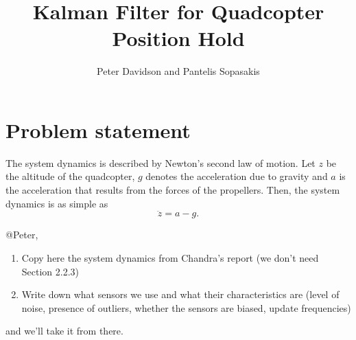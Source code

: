 \documentclass{article}
\title{Kalman Filter for Quadcopter Position Hold}
\author{Peter Davidson and Pantelis Sopasakis}
\begin{document}
\maketitle

\section{Problem statement}
The system dynamics is described by Newton's second law of motion.
Let $z$ be the altitude of the quadcopter, $g$ denotes the acceleration
due to gravity and $a$ is the acceleration that results from the forces
of the propellers. Then, the system dynamics is as simple as
\begin{equation}
    \ddot{z} = a - g.
\end{equation}


@Peter,
\begin{enumerate}
    \item Copy here the system dynamics from Chandra's report (we don't need Section 2.2.3)
    \item Write down what sensors we use and what their characteristics are (level of noise,
          presence of outliers, whether the sensors are biased, update frequencies)
\end{enumerate}
and we'll take it from there.


\end{document}
